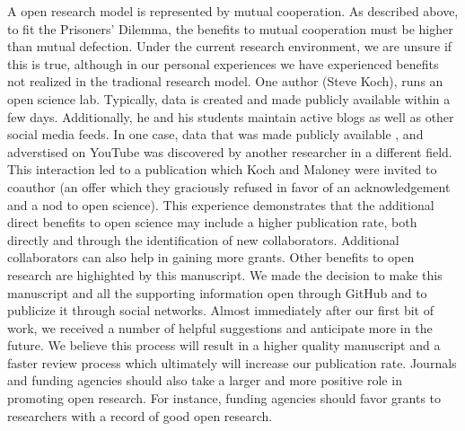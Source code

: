 \documentclass[11pt]{article} %
\begin{document}
A open research model is represented by mutual cooperation. As described above, to fit the Prisoners' Dilemma, the benefits to mutual cooperation must be higher than mutual defection. Under the current research environment, we are unsure if this is true, although in our personal experiences we have experienced benefits not realized in the tradional research model. One author (Steve Koch), runs an open science lab. Typically, data is created and made publicly available within a few days. Additionally, he and his students maintain active blogs as well as other social media feeds. In one case, data that was made publicly available , and adverstised on YouTube \cite{koch_kochlab, maloney_koch} was discovered by another researcher in a different field. This interaction led to a publication \cite{deutsch_mechanics_2011} which Koch and Maloney were invited to coauthor (an offer which they graciously refused in favor of an acknowledgement and a nod to open science)\cite{koch_steve_2011}. This experience demonstrates that the additional direct benefits to open science may include a higher publication rate, both directly and through the identification of new collaborators. Additional collaborators can also help in gaining more grants. Other benefits to open research are highighted by this manuscript. We made the decision to make this manuscript and all the supporting information open through GitHub\cite{olendorf_gtos_github} and to publicize it through social networks. Almost immediately after our first bit of work, we received a number of helpful suggestions and anticipate more in the future. We believe this process will result in a higher quality manuscript and a faster review process which ultimately will increase our publication rate.  Journals and funding agencies should also take a larger and more positive role in promoting open research. For instance, funding agencies should favor grants to researchers with a record of good open research.
\end{document}

